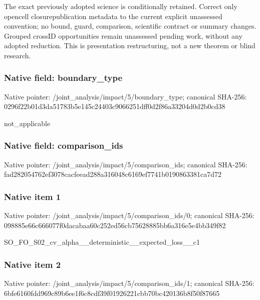 \documentclass[10pt,a4paper]{article}
\begin{document}
The exact previously adopted science is conditionally retained. Correct only opencell closurepublication metadata to the current explicit unassessed convention; no bound, guard, comparison, scientific contract or summary changes. Grouped crossID opportunities remain unassessed pending work, without any adopted reduction. This is presentation restructuring, not a new theorem or blind research.


\subsubsection{Native field: boundary\_type}


Native pointer: /joint\_analysis/impact/5/boundary\_type; canonical SHA-256: 0296f22b01d3da51783b5e14\allowbreak{}5c24403c9066251dff0d2f86\allowbreak{}a33204d0d2b0cd38


not\_applicable


\subsubsection{Native field: comparison\_ids}


Native pointer: /joint\_analysis/impact/5/comparison\_ids; canonical SHA-256: fad282054762ef3078cacfee\allowbreak{}ad288a316048c6169ef7741b\allowbreak{}0190863381ca7d72



\subsubsection{Native item 1}


Native pointer: /joint\_analysis/impact/5\allowbreak{}/comparison\_ids/0; canonical SHA-256: 098885e66c666077f0dacaba\allowbreak{}a60c252ed56cb75628885bb6\allowbreak{}a316e5e4bb349f82


SO\_FO\_S02\_cv\_alpha\_\_dete\allowbreak{}rministic\_\_expected\_loss\allowbreak{}\_\_c1


\subsubsection{Native item 2}


Native pointer: /joint\_analysis/impact/5\allowbreak{}/comparison\_ids/1; canonical SHA-256: 6bfe6160fdd969c89b6ee1f6\allowbreak{}c8cdf39f01926221cbb70bc4\allowbreak{}20136b8f50f87665
\end{document}
